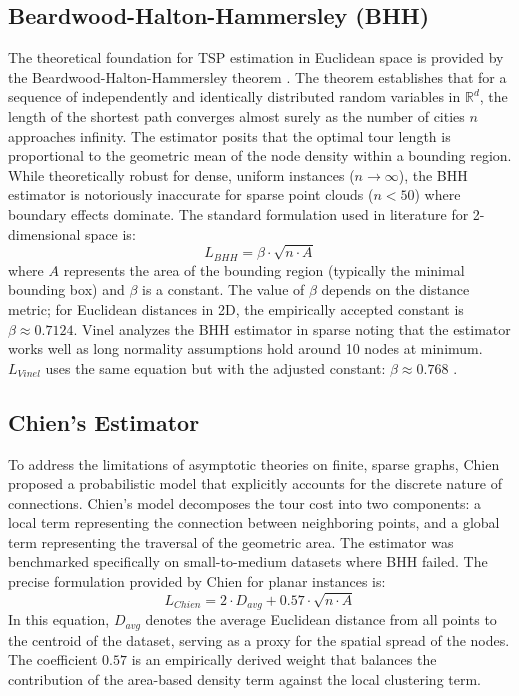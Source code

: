 \documentclass{article}
\begin{document}
\subsection{Beardwood-Halton-Hammersley (BHH)}

The theoretical foundation for TSP estimation in Euclidean space is provided by the Beardwood-Halton-Hammersley theorem \cite{bhh1959}. The theorem establishes that for a sequence of independently and identically distributed random variables in $\mathbb{R}^d$, the length of the shortest path converges almost surely as the number of cities $n$ approaches infinity. The estimator posits that the optimal tour length is proportional to the geometric mean of the node density within a bounding region. While theoretically robust for dense, uniform instances ($n \to \infty$), the BHH estimator is notoriously inaccurate for sparse point clouds ($n < 50$) where boundary effects dominate. The standard formulation used in literature for 2-dimensional space is:
\begin{equation}
L_{BHH} = \beta \cdot \sqrt{n \cdot A}
\end{equation}
where $A$ represents the area of the bounding region (typically the minimal bounding box) and $\beta$ is a constant. The value of $\beta$ depends on the distance metric; for Euclidean distances in 2D, the empirically accepted constant is $\beta \approx 0.7124$. Vinel \cite{vinel2018probability} analyzes the BHH estimator in sparse noting that the estimator works well as long normality assumptions hold around 10 nodes at minimum. $L_{Vinel}$ uses the same equation but with the adjusted constant:  $\beta \approx 0.768$ \cite{vinel2018probability}.

\subsection{Chien's Estimator}

To address the limitations of asymptotic theories on finite, sparse graphs, Chien \cite{chien1989} proposed a probabilistic model that explicitly accounts for the discrete nature of connections. Chien's model decomposes the tour cost into two components: a local term representing the connection between neighboring points, and a global term representing the traversal of the geometric area. The estimator was benchmarked specifically on small-to-medium datasets where BHH failed. The precise formulation provided by Chien for planar instances is:
\begin{equation}
L_{Chien} = 2 \cdot D_{avg} + 0.57 \cdot \sqrt{n \cdot A}
\end{equation}
In this equation, $D_{avg}$ denotes the average Euclidean distance from all points to the centroid of the dataset, serving as a proxy for the spatial spread of the nodes. The coefficient $0.57$ is an empirically derived weight that balances the contribution of the area-based density term against the local clustering term.
\end{document}
